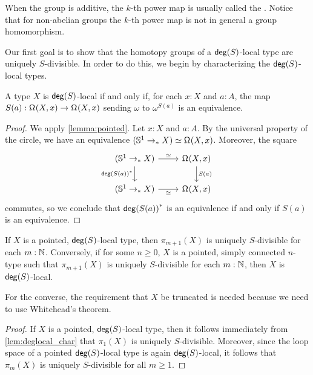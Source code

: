 \begin{rmk}
When the group is additive, the $k$-th power map is usually called the .
Notice that for non-abelian groups the $k$-th power map is not in general a group homomorphism.
\end{rmk}

Our first goal is to show that the homotopy groups of a $\mathsf{deg}(S)$-local type
are uniquely $S$-divisible.
In order to do this, we begin by characterizing the $\mathsf{deg}(S)$-local types.

\begin{lem}\label{lem:deglocal_char}
A type $X$ is $\mathsf{deg}(S)$-local if and only if, for each $x:X$ and $a:A$, the map
$S(a) : \mathsf{\Omega}^{}(X,x) \to \mathsf{\Omega}^{}(X,x)$ sending 
$\omega$ to $\omega^{S(a)}$ is an equivalence.
\end{lem}

\begin{proof}
We apply \cref{lemma:pointed}.
Let $x:X$ and $a:A$.
By the universal property of the circle, we have an equivalence
$(\mathbb{S}^{1} \to_{\ast} X) \simeq \mathsf{\Omega}^{}(X,x)$.
Moreover, the square
\[
  \begin{tikzcd}
    (\sphere{1} \pto X) \arrow[r,"\simeq"] \arrow[d,swap,"\precomp{\degg(S(a))}"] & \loopspace{X,x} \arrow[d,"S(a)"] \\
    (\sphere{1} \pto X) \arrow[r,swap,"\simeq"] & \loopspace{X,x}
  \end{tikzcd}
\]
commutes, so we conclude that ${\mathsf{deg}(S(a))}^\ast$ is an equivalence if and only if $S(a)$ is an equivalence.
\end{proof}

\begin{prp}\label{prop:homotopygroupsoflocalarelocal}
    If $X$ is a pointed, $\mathsf{deg}(S)$-local type, then $\pi_{m+1}(X)$ is uniquely $S$-divisible
    for each $m : \mathbb{N}$.
    Conversely, if for some $n \geq 0$, $X$ is a pointed, simply connected $n$-type
    such that $\pi_{m+1}(X)$ is uniquely $S$-divisible for each $m : \mathbb{N}$,
    then $X$ is $\mathsf{deg}(S)$-local.
\end{prp}

For the converse, the requirement that $X$ be truncated is needed because
we need to use Whitehead's theorem.

\begin{proof}
If $X$ is a pointed, $\mathsf{deg}(S)$-local type, then it follows immediately from \cref{lem:deglocal_char} that $\pi_1(X)$ is uniquely $S$-divisible. Moreover, since the loop space of a pointed $\mathsf{deg}(S)$-local type is again $\mathsf{deg}(S)$-local, it follows that $\pi_m(X)$ is uniquely $S$-divisible for all $m\geq 1$.
\end{proof}

